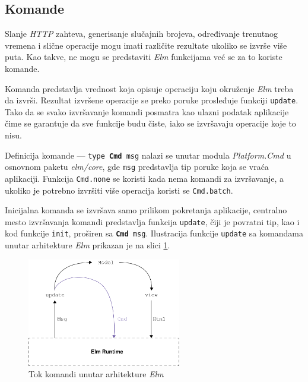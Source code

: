 \documentclass[12pt,oneside]{memoir}
\begin{document}
\subsection{Komande}
Slanje \emph{HTTP} zahteva, generisanje slučajnih brojeva, određivanje trenutnog vremena i slične operacije
mogu imati različite rezultate ukoliko se izvrše više puta. Kao takve, ne mogu se predstaviti \emph{Elm}
funkcijama već se za to koriste komande.

Komanda predstavlja vrednost koja opisuje operaciju koju okruženje \emph{Elm} treba da izvrši.
Rezultat izvršene operacije se preko poruke prosleđuje funkciji \texttt{update}. Tako da se svako
izvršavanje komandi posmatra kao ulazni podatak aplikacije čime se garantuje da sve funkcije budu
čiste, iako se izvršavaju operacije koje to nisu.

Definicija komande --- \texttt{type \textbf{Cmd} msg} nalazi se unutar modula \emph{Platform.Cmd} 
u osnovnom paketu \emph{elm/core}, gde \texttt{msg} predstavlja tip poruke koja se vraća aplikaciji.
Funkcija \texttt{Cmd.none} se koristi kada nema komandi za izvršavanje, a ukoliko je potrebno izvršiti
više operacija koristi se \texttt{Cmd.batch}.

Inicijalna komanda se izvršava samo prilikom pokretanja aplikacije, centralno mesto izvršavanja komandi
predstavlja funkcija \texttt{update}, čiji je povratni tip, kao i kod funkcije \texttt{init}, proširen sa \texttt{\textbf{Cmd} msg}.
Ilustracija funkcije \texttt{update} sa komandama unutar arhitekture \emph{Elm} prikazan je na slici \ref{fig:elm-command}.
\begin{figure}[!h]
  \centering
  \includegraphics[width=0.6\textwidth]{elm-command.png}
  \caption{Tok komandi unutar arhitekture \emph{Elm}}
  \label{fig:elm-command}
\end{figure}
\end{document}
